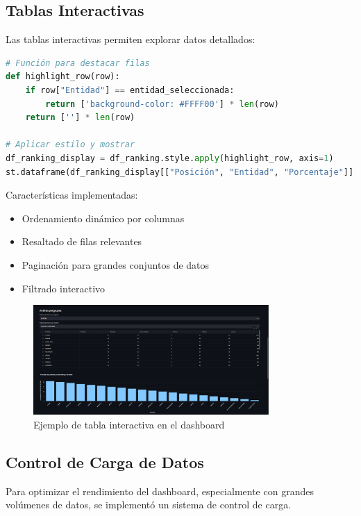 \subsection{Tablas Interactivas}
Las tablas interactivas permiten explorar datos detallados:

\begin{lstlisting}[language=Python, caption=Implementación de tablas interactivas]
# Función para destacar filas
def highlight_row(row):
    if row["Entidad"] == entidad_seleccionada:
        return ['background-color: #FFFF00'] * len(row)
    return [''] * len(row)

# Aplicar estilo y mostrar
df_ranking_display = df_ranking.style.apply(highlight_row, axis=1)
st.dataframe(df_ranking_display[["Posición", "Entidad", "Porcentaje"]], height=400)
\end{lstlisting}

Características implementadas:
\begin{itemize}
    \item Ordenamiento dinámico por columnas
    \item Resaltado de filas relevantes
    \item Paginación para grandes conjuntos de datos
    \item Filtrado interactivo
\end{itemize}

\begin{figure}[h]
    \centering
    \includegraphics[width=0.8\textwidth]{../imagenes/analisis por gruoi.png}
    \caption{Ejemplo de tabla interactiva en el dashboard}
    \label{fig:tabla_interactiva}
\end{figure}

\subsection{Control de Carga de Datos}
Para optimizar el rendimiento del dashboard, especialmente con grandes volúmenes de datos, se implementó un sistema de control de carga.

